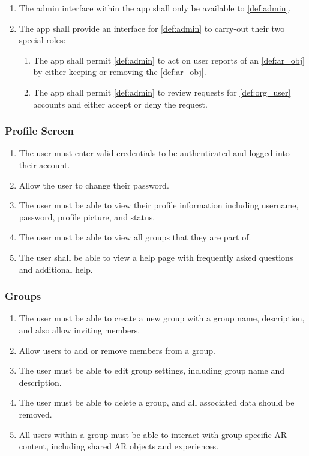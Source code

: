 \documentclass{article}
\begin{document}
\begin{enumerate}[align=left, label=\textbf{AI-FR\arabic*:}]
    \item The admin interface within the app shall only be available to \ref{def:admin}.
    \item The app shall provide an interface for \ref{def:admin} to carry-out their two special roles:
          \begin{enumerate}[align=left, label=\textbf{AI-FR2.\arabic*:}]
              \item The app shall permit \ref{def:admin} to act on user reports of an \ref{def:ar_obj} by either keeping or removing the \ref{def:ar_obj}.
              \item The app shall permit \ref{def:admin} to review requests for \ref{def:org_user} accounts and either accept or deny the request.
          \end{enumerate}
\end{enumerate}

\subsubsection{Profile Screen}
\label{ssub:profile_screen}
\begin{enumerate}[align=left, label=\textbf{PS-FR\arabic*:}]
    \item The user must enter valid credentials to be authenticated and logged into their account.
    \item Allow the user to change their password.
    \item The user must be able to view their profile information including username, password, profile picture, and status.
    \item The user must be able to view all groups that they are part of.
    \item The user shall be able to view a help page with frequently asked questions and additional help.
\end{enumerate}

\subsubsection{Groups}
\label{ssub:groups}
\begin{enumerate}[align=left, label=\textbf{G-FR\arabic*:}]
    \item The user must be able to create a new group with a group name, description, and also allow inviting members.
    \item Allow users to add or remove members from a group.
    \item The user must be able to edit group settings, including group name and description.
    \item The user must be able to delete a group, and all associated data should be removed.
    \item All users within a group must be able to interact with group-specific AR content, including shared AR objects and experiences.
\end{enumerate}
\end{document}
